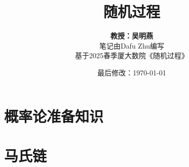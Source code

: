\documentclass{article}
\title{随机过程}
\author{\textbf{教授：吴明燕} \\ 笔记由Dafu Zhu编写 \\ 基于2025春季厦大数院《随机过程》}
\date{最后修改：\today}
\begin{document}
\maketitle

\tableofcontents

\pagebreak

\section{概率论准备知识}


\pagebreak

\section{马氏链}


\pagebreak

%




\end{document}
